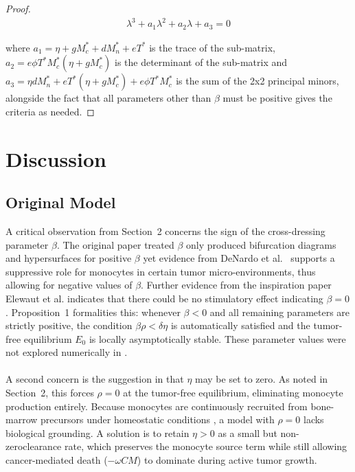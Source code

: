 \documentclass[11pt]{article}
\theoremstyle{definition}
\begin{document}
\begin{proof}
\begin{align*}
  \lambda^3
+ a_1 \lambda^2
+ a_2\lambda
+ a_3
= 0
\end{align*}

\noindent where $a_1 =\eta + gM_c^* + dM_n^* + eT^*$ is the trace of the sub-matrix, $a_2 = e\phi T^* M_c^*(\eta + gM_c^*)$ is the determinant of the sub-matrix and $ a_3 = \eta d M_n^* + eT^*(\eta + gM_c^*) + e\phi T^* M_c^*$ is the sum of the 2x2 principal minors, alongside the fact that all parameters other than $\beta$ must be positive gives the criteria as needed.
\end{proof}

\section{Discussion}
\subsection*{Original Model}
A critical observation from Section~2 concerns the sign of the cross-dressing
parameter $\beta$. The original paper treated $\beta$ only produced bifurcation diagrams and hypersurfaces
for positive $\beta$
yet evidence from DeNardo et al.\ \parencite{DeNardo2019} 
supports a suppressive role for monocytes in certain tumor micro-environments,
thus allowing for negative values of $\beta$. Further evidence from the inspiration paper Elewaut et al. indicates that there could 
be no stimulatory effect indicating $\beta =0$. Proposition~1 formalities this: whenever
$\beta < 0$ and all remaining parameters are strictly positive, the condition
$\beta\rho < \delta\eta$ is automatically satisfied and the tumor-free
equilibrium $E_0$ is locally asymptotically stable. These parameter values were not
explored numerically in \parencite{ERX2026}. 
\\
\\
A second concern is the suggestion in \parencite{ERX2026} that $\eta$ may be
set to zero. As noted in Section~2, this forces $\rho = 0$ at the tumor-free
equilibrium, eliminating monocyte production entirely. Because monocytes are
continuously recruited from bone-marrow precursors under homeostatic conditions
\parencite{reis2021bringing}, a model with $\rho = 0$ lacks biological
grounding. A solution is to retain $\eta > 0$ as a small but non-zeroclearance rate, which preserves the monocyte source term while still
allowing cancer-mediated death ($-\omega CM$) to dominate during active tumor
growth.
\end{document}
